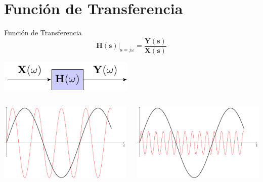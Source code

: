 \documentclass[xcolor={usenames,svgnames,dvipsnames}]{beamer}
\newcommand{\laplace}[1]{\mathbf{#1}(\mathbf{s})}
\newcommand{\slp}{\mathbf{s}}
\begin{document}
\section{Función de Transferencia}
\label{sec:org62e152e}
\begin{frame}[label={sec:org1319266}]{Función de Transferencia}
\[
  \laplace{H}\rvert_{\slp = j\omega} = \frac{\laplace{Y}}{\laplace{X}}
\]

\begin{center}
\includegraphics[width=.9\linewidth]{figs/TransferFunction.pdf}
\end{center}


\begin{columns}
\begin{column}{0.5\columnwidth}
\begin{center}
\includegraphics[width=.9\linewidth]{figs/sinX.pdf}
\end{center}
\end{column}

\begin{column}{0.5\columnwidth}
\begin{center}
\includegraphics[width=.9\linewidth]{figs/sinY.pdf}
\end{center}
\end{column}
\end{columns}
\end{frame}
\end{document}
